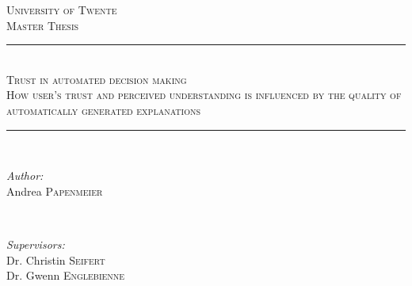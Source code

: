 \begin{titlepage}

\newcommand{\HRule}{\rule{\linewidth}{0.5mm}} %

\center %
 

\textsc{\LARGE University of Twente}\\[1.5cm] %
\textsc{\large Master Thesis}\\[0.5cm] %


\HRule \\[0.4cm]
\textsc{\Large Trust in automated decision making}\\[0.5cm] %
\textsc{\large How user's trust and perceived understanding is influenced by the quality of automatically generated explanations}\\[0.5cm] %
\HRule \\[1.5cm]
 


\begin{minipage}{0.4\textwidth}
\begin{flushleft} \large
\emph{Author:}\\
Andrea \textsc{Papenmeier} %
\end{flushleft}
\end{minipage}
~
\begin{minipage}{0.4\textwidth}
\begin{flushright} \large
\emph{Supervisors:} \\
Dr. Christin \textsc{Seifert} \\%
Dr. Gwenn \textsc{Englebienne} %
\end{flushright}
\end{minipage}\\[2cm]



\end{titlepage}

